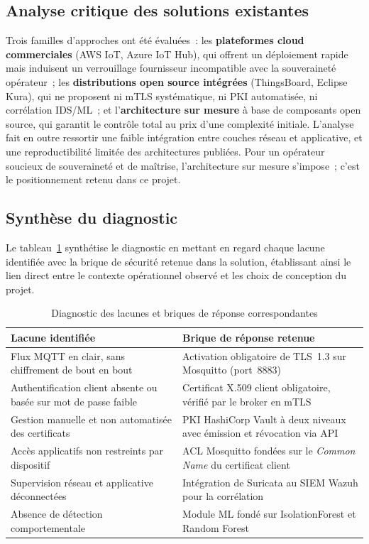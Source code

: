 \subsection{Analyse critique des solutions existantes}

Trois familles d'approches ont été évaluées~: les \textbf{plateformes cloud commerciales} (AWS IoT, Azure IoT Hub), qui offrent un déploiement rapide mais induisent un verrouillage fournisseur incompatible avec la souveraineté opérateur~; les \textbf{distributions open source intégrées} (ThingsBoard, Eclipse Kura), qui ne proposent ni mTLS systématique, ni PKI automatisée, ni corrélation IDS/ML~; et l'\textbf{architecture sur mesure} à base de composants open source, qui garantit le contrôle total au prix d'une complexité initiale. L'analyse fait en outre ressortir une faible intégration entre couches réseau et applicative, et une reproductibilité limitée des architectures publiées. Pour un opérateur soucieux de souveraineté et de maîtrise, l'architecture sur mesure s'impose~; c'est le positionnement retenu dans ce projet.

\subsection{Synthèse du diagnostic}

Le tableau~\ref{tab:diagnostic} synthétise le diagnostic en mettant en regard chaque lacune identifiée avec la brique de sécurité retenue dans la solution, établissant ainsi le lien direct entre le contexte opérationnel observé et les choix de conception du projet.

\begin{table}[!htbp]
\centering
\caption{Diagnostic des lacunes et briques de réponse correspondantes}
\label{tab:diagnostic}
\small
\begin{tabularx}{\linewidth}{|>{\raggedright\arraybackslash}X|>{\raggedright\arraybackslash}X|}
\hline
\textbf{Lacune identifiée} & \textbf{Brique de réponse retenue} \\
\hline
Flux MQTT en clair, sans chiffrement de bout en bout & Activation obligatoire de TLS~1.3 sur Mosquitto (port~8883) \\ \hline
Authentification client absente ou basée sur mot de passe faible & Certificat X.509 client obligatoire, vérifié par le broker en mTLS \\ \hline
Gestion manuelle et non automatisée des certificats & PKI HashiCorp Vault à deux niveaux avec émission et révocation via API \\ \hline
Accès applicatifs non restreints par dispositif & ACL Mosquitto fondées sur le \emph{Common Name} du certificat client \\ \hline
Supervision réseau et applicative déconnectées & Intégration de Suricata au SIEM Wazuh pour la corrélation \\ \hline
Absence de détection comportementale & Module ML fondé sur IsolationForest et Random Forest \\ \hline
\end{tabularx}
\end{table}

